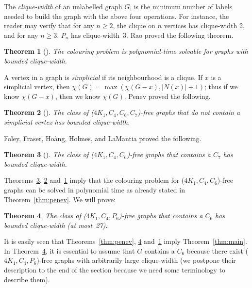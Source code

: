 \documentclass[12pt]{article}
\newtheorem{Theorem}{Theorem}[section]
\begin{document}
	The {\it clique-width} of an unlabelled graph $G$, is the minimum number of labels needed to build the graph with the above four operations.  
	For instance, the reader may verify that for any $n\geq 2$, the clique on $n$ vertices has clique-width 2, and for any $n\geq 3$,  $P_n$ has clique-width~3. Rao \cite{Rao} proved the following theorem. 
	
	\begin{Theorem}[\cite{Rao}]\label{thm:Rao2007}
		The colouring problem is polynomial-time solvable for graphs with bounded clique-width.
	\end{Theorem}
	
	A vertex in a graph is {\it simplicial} if its neighbourhood is a clique. If $x$ is a simplicial vertex, then $\chi(G) = \max (\chi(G-x), |N(x)| + 1)$; thus if we know $\chi(G-x)$, then we know $\chi(G)$. Penev proved the following.
	
	\begin{Theorem}[\cite{Pen2020}]\label{thm:n-simplicial}
		The class of ($4K_1, C_4, C_6, C_7$)-free graphs that do not contain a simplicial vertex has bounded clique-width. 
	\end{Theorem}
	
	Foley, Fraser, Ho\`ang, Holmes, and LaMantia proved the following. 
	
	\begin{Theorem}[\cite{FolFra2020}]\label{thm:C7}
		The class of ($4K_1, C_4, C_6$)-free graphs that contains a $C_7$ has bounded clique-width. 
	\end{Theorem}
	
	Theorems~\ref{thm:C7}, \ref{thm:n-simplicial} and~\ref{thm:Rao2007} imply that the colouring problem for ($4K_1, C_4, C_6$)-free graphs can be solved in polynomial time as already stated in Theorem~\ref{thm:penev}. We will prove:
	
	\begin{Theorem}\label{thm:main-bounded}
		The class of ($4K_1, C_4, P_6$)-free graphs that contains a $C_6$ has bounded clique-width (at most~27).
	\end{Theorem}
	
	It is easily seen that Theorems~\ref{thm:penev}, \ref{thm:main-bounded} and~\ref{thm:Rao2007} imply Theorem~\ref{thm:main}.  In Theorem~\ref{thm:main-bounded}, it is essential to assume that $G$ contains a $C_6$ because there exist ($4K_1, C_4, P_6$)-free graphs with arbitrarily large clique-width (we postpone their description to the end of the section because we need some terminology to describe them). 
	
\end{document}
